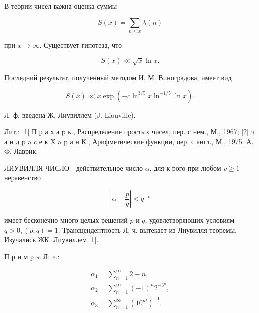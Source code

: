 \documentclass[10pt]{article}
\begin{document}
В теории чисел важна оценка суммы



\[

S(x)=\sum_{n \leqslant x} \lambda(n)

\]



при $x \rightarrow \infty$. Существует гипотеза, что



\[

S(x) \ll \sqrt{x} \ln x .

\]



Последний результат, полученный методом И. М. Виноградова, имеет вид



\[

S(x) \ll x \exp \left(-c \ln ^{3 / 5} x \ln ^{-1 / 5} \ln x\right) .

\]



Л. ф. введена Ж. Лиувиллем (J. Liouville).



Лит.: [1] П р а х а p к., Распределение простых чисел, пер. с нем., М., 1967; [2] ч а н д p a c е к X a p а н К., Арифметические функции, пер. с англ., М., 1975. А. Ф. Лаврик.



ЛИУВИЛЛЯ ЧИСЛО - действительное число $\alpha$, для к-рого при любом $v \geqslant 1$ неравенство



\[

\left|\alpha-\frac{p}{q}\right|<q^{-v}

\]



имеет бесконечно много целых решений $p$ и $q$, удовлетворяющих условиям $q>0,(p, q)=1$. Трансцендентность Л. ч. вытекает из Лиувилля теоремы. Изучались ЖК. Лиувиллем [1].



П р и м р ы Л. ч.:



\[

\begin{gathered}

\alpha_{1}=\sum_{n=1}^{\infty} 2-n, \\

\alpha_{2}=\sum_{n=1}^{\infty}(-1)^{n} 2^{-3^{n}}, \\

\alpha_{3}=\sum_{n=1}^{\infty}\left(10^{n !}\right)^{-1} .

\end{gathered}

\]
\end{document}
